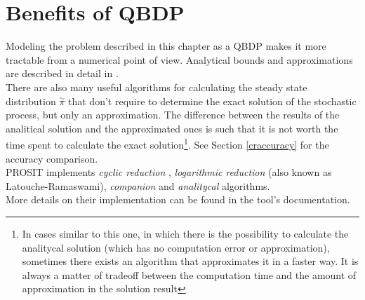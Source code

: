 \section{Benefits of QBDP} \label{benefits}
Modeling the problem described in this chapter as a QBDP makes it more tractable from a numerical point of view. Analytical bounds and approximations are described in detail in \cite{probGuarantees}.\\
There are also many useful algorithms for calculating the steady state distribution \( \overset{\sim}{\pi} \) that don't require to determine the exact solution of the stochastic process, but only an approximation. The difference between the results of the analitical solution and the approximated ones is such that it is not worth the time spent to calculate the exact solution\footnote{In cases similar to this one, in which there is the possibility to calculate the analitycal solution (which has no computation error or approximation), sometimes there exists an algorithm that approximates it in a faster way. It is always a matter of tradeoff between the computation time and the amount of approximation in the solution result}. See Section \ref{craccuracy} for the accuracy comparison.\\
PROSIT implements \emph{cyclic reduction} \cite{cyclic}, \emph{logarithmic reduction} \cite{latouche} (also known as Latouche-Ramaswami), \emph{companion} \cite{probGuarantees} and \emph{analitycal} \cite{probGuarantees} algorithms.\\
More details on their implementation can be found in the tool's documentation.